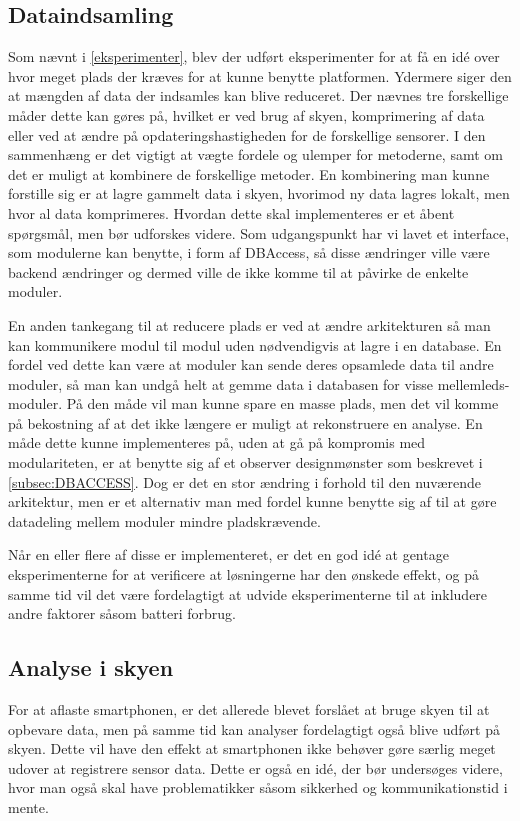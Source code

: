 \subsection{Dataindsamling}
Som nævnt i \cref{eksperimenter}, blev der udført eksperimenter for at få en idé over hvor meget plads der kræves for at kunne benytte platformen.
Ydermere siger den at mængden af data der indsamles kan blive reduceret.
Der nævnes tre forskellige måder dette kan gøres på, hvilket er ved brug af skyen, komprimering af data eller ved at ændre på opdateringshastigheden for de forskellige sensorer.
I den sammenhæng er det vigtigt at vægte fordele og ulemper for metoderne, samt om det er muligt at kombinere de forskellige metoder.
En kombinering man kunne forstille sig er at lagre gammelt data i skyen, hvorimod ny data lagres lokalt, men hvor al data komprimeres.
Hvordan dette skal implementeres er et åbent spørgsmål, men bør udforskes videre.
Som udgangspunkt har vi lavet et interface, som modulerne kan benytte, i form af DBAccess, så disse ændringer ville være backend ændringer og dermed ville de ikke komme til at påvirke de enkelte moduler.


En anden tankegang til at reducere plads er ved at ændre arkitekturen så man kan kommunikere modul til modul uden nødvendigvis at lagre i en database.
En fordel ved dette kan være at moduler kan sende deres opsamlede data til andre moduler, så man kan undgå helt at gemme data i databasen for visse mellemleds-moduler.
På den måde vil man kunne spare en masse plads, men det vil komme på bekostning af at det ikke længere er muligt at rekonstruere en analyse. En måde dette kunne implementeres på, uden at gå på kompromis med modulariteten, er at benytte sig af et observer designmønster som beskrevet i \cref{subsec:DBACCESS}.
Dog er det en stor ændring i forhold til den nuværende arkitektur, men er et alternativ man med fordel kunne benytte sig af til at gøre datadeling mellem moduler mindre pladskrævende.

Når en eller flere af disse er implementeret, er det en god idé at gentage eksperimenterne for at verificere at løsningerne har den ønskede effekt, og på samme tid vil det være fordelagtigt at udvide eksperimenterne til at inkludere andre faktorer såsom batteri forbrug.

\subsection{Analyse i skyen}
For at aflaste smartphonen, er det allerede blevet forslået at bruge skyen til at opbevare data, men på samme tid kan analyser fordelagtigt også blive udført på skyen. 
Dette vil have den effekt at smartphonen ikke behøver gøre særlig meget udover at registrere sensor data.
Dette er også en idé, der bør undersøges videre, hvor man også skal have problematikker såsom sikkerhed og kommunikationstid i mente.

